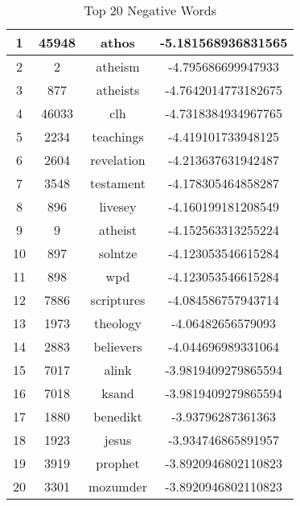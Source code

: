 \documentclass[twoside]{homework}
\begin{document}
\begin{itemize}
\begin{itemize}
\begin{table}[h!]
\begin{tabular}{||c c c c||}
                    \hline\hline
                    1 & 45948 & athos & -5.181568936831565\\
                    \hline
                    2 & 2 & atheism & -4.795686699947933\\
                    \hline
                    3 & 877 & atheists & -4.7642014773182675\\
                    \hline
                    4 & 46033 & clh & -4.7318384934967765\\
                    \hline
                    5 & 2234 & teachings & -4.419101733948125\\
                    \hline
                    6 & 2604 & revelation & -4.213637631942487\\
                    \hline
                    7 & 3548 & testament & -4.178305464858287\\
                    \hline
                    8 & 896 & livesey & -4.160199181208549\\
                    \hline
                    9 & 9 & atheist & -4.152563313255224\\
                    \hline
                    10 & 897 & solntze & -4.123053546615284\\
                    \hline
                    11 & 898 & wpd & -4.123053546615284\\
                    \hline
                    12 & 7886 & scriptures & -4.084586757943714\\
                    \hline
                    13 & 1973 & theology & -4.06482656579093\\
                    \hline
                    14 & 2883 & believers & -4.044696989331064\\
                    \hline
                    15 & 7017 & alink & -3.9819409279865594\\
                    \hline
                    16 & 7018 & ksand & -3.9819409279865594\\
                    \hline
                    17 & 1880 & benedikt & -3.93796287361363\\
                    \hline
                    18 & 1923 & jesus & -3.934746865891957\\
                    \hline
                    19 & 3919 & prophet & -3.8920946802110823\\
                    \hline
                    20 & 3301 & mozumder & -3.8920946802110823\\
                    \hline
                \end{tabular}
                \caption{Top 20 Negative Words}
                \label{table:2}
            \end{table}
        \end{itemize}
\end{itemize}
\clearpage
\end{document}
